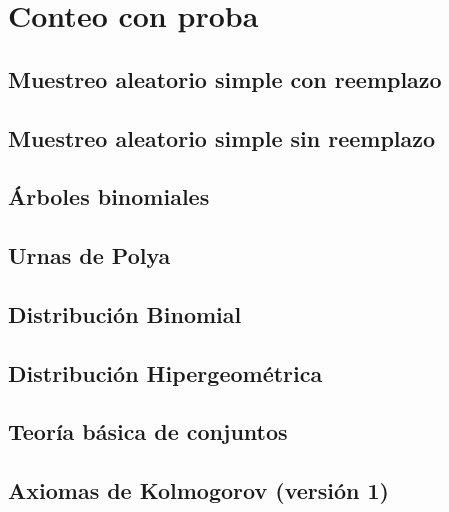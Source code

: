 \documentclass[
]{book}
\begin{document}
\hypertarget{conteo-con-proba}{%
\section{Conteo con proba}\label{conteo-con-proba}}

\hypertarget{muestreo-aleatorio-simple-con-reemplazo}{%
\subsection{Muestreo aleatorio simple con reemplazo}\label{muestreo-aleatorio-simple-con-reemplazo}}

\hypertarget{muestreo-aleatorio-simple-sin-reemplazo}{%
\subsection{Muestreo aleatorio simple sin reemplazo}\label{muestreo-aleatorio-simple-sin-reemplazo}}

\hypertarget{uxe1rboles-binomiales}{%
\subsection{Árboles binomiales}\label{uxe1rboles-binomiales}}

\hypertarget{urnas-de-polya}{%
\subsection{Urnas de Polya}\label{urnas-de-polya}}

\hypertarget{distribuciuxf3n-binomial}{%
\subsection{Distribución Binomial}\label{distribuciuxf3n-binomial}}

\hypertarget{distribuciuxf3n-hipergeomuxe9trica}{%
\subsection{Distribución Hipergeométrica}\label{distribuciuxf3n-hipergeomuxe9trica}}

\hypertarget{teoruxeda-buxe1sica-de-conjuntos}{%
\subsection{Teoría básica de conjuntos}\label{teoruxeda-buxe1sica-de-conjuntos}}

\hypertarget{axiomas-de-kolmogorov-versiuxf3n-1}{%
\subsection{Axiomas de Kolmogorov (versión 1)}\label{axiomas-de-kolmogorov-versiuxf3n-1}}
\end{document}
